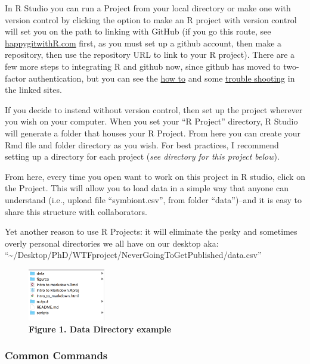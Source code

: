 \documentclass[
]{article}
\begin{document}
In R Studio you can run a Project from your local directory or make one
with version control by clicking the option to make an R project with
version control will set you on the path to linking with GitHub (if you
go this route, see
\href{http://happygitwithr.com/rstudio-git-github.html}{happygitwithR.com}
first, as you must set up a github account, then make a repository, then
use the repository URL to link to your R project). There are a few more
steps to integrating R and github now, since github has moved to
two-factor authentication, but you can see the
\href{https://docs.github.com/en/authentication/securing-your-account-with-two-factor-authentication-2fa/accessing-github-using-two-factor-authentication}{how
to} and some
\href{https://stackoverflow.com/questions/66065099/how-to-update-github-authentification-token-on-rstudio-to-match-the-new-policy}{trouble
shooting} in the linked sites.

If you decide to instead without version control, then set up the
project wherever you wish on your computer. When you set your ``R
Project'' directory, R Studio will generate a folder that houses your R
Project. From here you can create your Rmd file and folder directory as
you wish. For best practices, I recommend setting up a directory for
each project (\emph{see directory for this project below}).

From here, every time you open want to work on this project in R studio,
click on the Project. This will allow you to load data in a simple way
that anyone can understand (i.e., upload file ``symbiont.csv'', from
folder ``data'')--and it is easy to share this structure with
collaborators.

Yet another reason to use R Projects: it will eliminate the pesky and
sometimes overly personal directories we all have on our desktop aka:
``\textasciitilde/Desktop/PhD/WTFproject/NeverGoingToGetPublished/data.csv''

\begin{figure}
\centering
\includegraphics[width=0.3\textwidth,height=\textheight]{data/directory example.png}
\caption{\textbf{Figure 1. Data Directory example}}
\end{figure}

\hypertarget{common-commands}{%
\subsubsection{Common Commands}\label{common-commands}}
\end{document}

